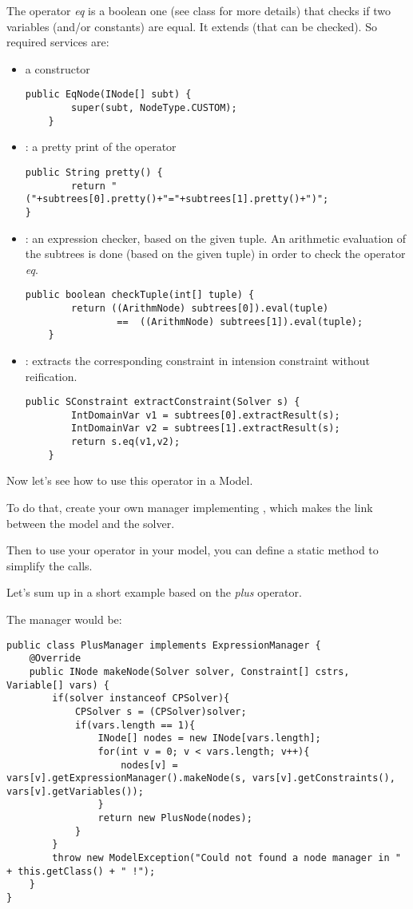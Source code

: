The operator \textit{eq} is a boolean one (see   class for more details) that checks if two variables (and/or constants) are equal. It extends   (that can be checked). So required services are:
\begin{itemize}
\item a constructor
\begin{lstlisting}
public EqNode(INode[] subt) {
        super(subt, NodeType.CUSTOM);
    }
\end{lstlisting}
\item  {} : a pretty print of the operator
\begin{lstlisting}
public String pretty() {
        return "("+subtrees[0].pretty()+"="+subtrees[1].pretty()+")";
}
\end{lstlisting} 

\item  {}: an expression checker, based on the given tuple. An arithmetic evaluation of the subtrees is done (based on the given tuple) in order to check the operator \textit{eq}.
\begin{lstlisting}
public boolean checkTuple(int[] tuple) {
		return ((ArithmNode) subtrees[0]).eval(tuple)
		        ==  ((ArithmNode) subtrees[1]).eval(tuple);
	}
\end{lstlisting}

\item  {} : extracts the corresponding constraint in intension constraint without reification.
\begin{lstlisting}
public SConstraint extractConstraint(Solver s) {
        IntDomainVar v1 = subtrees[0].extractResult(s);
		IntDomainVar v2 = subtrees[1].extractResult(s);
		return s.eq(v1,v2);
    }
\end{lstlisting}
\end{itemize}
Now let's see how to use this operator in a Model.

To do that, create your own manager implementing , which makes the link between the model and the solver.

Then to use your operator in your model, you can define a static method to simplify the calls.

Let's sum up in a short example based on the \textit{plus} operator. 

The manager would be:
\begin{lstlisting}
public class PlusManager implements ExpressionManager {
    @Override
    public INode makeNode(Solver solver, Constraint[] cstrs, Variable[] vars) {
        if(solver instanceof CPSolver){
            CPSolver s = (CPSolver)solver;
            if(vars.length == 1){
                INode[] nodes = new INode[vars.length];
                for(int v = 0; v < vars.length; v++){
                    nodes[v] = vars[v].getExpressionManager().makeNode(s, vars[v].getConstraints(), vars[v].getVariables());
                }
                return new PlusNode(nodes);
            }
        }
        throw new ModelException("Could not found a node manager in " + this.getClass() + " !");
    }
}
\end{lstlisting}



